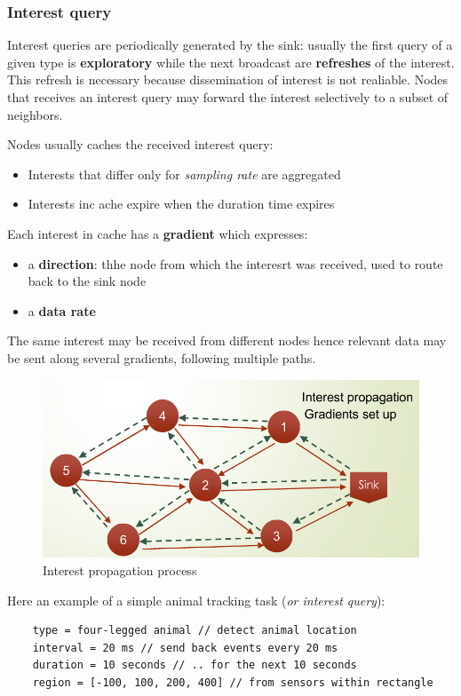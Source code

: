 \documentclass[10pt,a4paper]{report}
\theoremstyle{definition}
\begin{document}
\subsubsection{Interest query}\label{sec:interest-query}
Interest queries are periodically generated by the sink: usually the first query of a given type is \textbf{exploratory} while the next broadcast are \textbf{refreshes} of the interest. This refresh is necessary because dissemination of interest is not realiable.
Nodes that receives an interest query may forward  the interest selectively to a subset of neighbors.

Nodes usually caches the received interest query:
\begin{itemize}
	\item 
	Interests that differ only for \textit{sampling rate} are aggregated
	\item 
	Interests inc ache expire when the duration time expires
\end{itemize}
Each interest in cache has a \textbf{gradient} which expresses:
\begin{itemize}
	\item 
	a \textbf{direction}: thhe node from which the interesrt was received, used to route back to the sink node
	\item 
	a \textbf{data rate}

	
\end{itemize}
	The same interest may be received from different nodes hence relevant data may be sent along several gradients, following multiple paths.
\begin{figure}[h]
	\centering\includegraphics[scale=0.50]{images/Pasted image 20230522171354.png}
	\caption{Interest propagation process}
\end{figure}
Here an example of a simple animal tracking task (\textit{or interest query}):
\begin{verbatim}
	type = four-legged animal // detect animal location
	interval = 20 ms // send back events every 20 ms
	duration = 10 seconds // .. for the next 10 seconds
	region = [-100, 100, 200, 400] // from sensors within rectangle
\end{verbatim}
\end{document}
